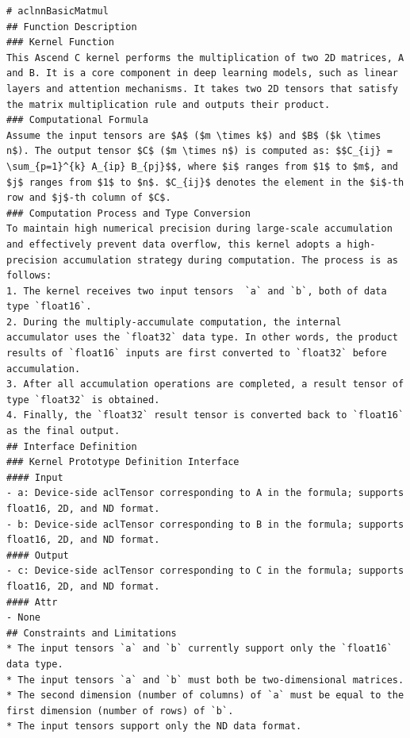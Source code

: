 \begin{table}[H]
\begin{tcolorbox}
\begin{tcolorbox}[
      sharp corners,
      colframe=taskblue,
      colback=taskblue!5,
      colbacktitle=taskblue!15,
      coltitle=taskblue,
      boxrule=0.4pt,
      title={\textbf{API\_Desc.md}},
      fonttitle=\bfseries\small,
      left=0pt,
      right=0pt,
      top=0pt,
      bottom=0pt
    ]
\begin{lstlisting}[style=mdstyle]
# aclnnBasicMatmul 
## Function Description 
### Kernel Function 
This Ascend C kernel performs the multiplication of two 2D matrices, A and B. It is a core component in deep learning models, such as linear layers and attention mechanisms. It takes two 2D tensors that satisfy the matrix multiplication rule and outputs their product.
### Computational Formula 
Assume the input tensors are $A$ ($m \times k$) and $B$ ($k \times n$). The output tensor $C$ ($m \times n$) is computed as: $$C_{ij} = \sum_{p=1}^{k} A_{ip} B_{pj}$$, where $i$ ranges from $1$ to $m$, and $j$ ranges from $1$ to $n$. $C_{ij}$ denotes the element in the $i$-th row and $j$-th column of $C$.
### Computation Process and Type Conversion
To maintain high numerical precision during large-scale accumulation and effectively prevent data overflow, this kernel adopts a high-precision accumulation strategy during computation. The process is as follows: 
1. The kernel receives two input tensors  `a` and `b`, both of data type `float16`.
2. During the multiply-accumulate computation, the internal accumulator uses the `float32` data type. In other words, the product results of `float16` inputs are first converted to `float32` before accumulation.
3. After all accumulation operations are completed, a result tensor of type `float32` is obtained.
4. Finally, the `float32` result tensor is converted back to `float16` as the final output.
## Interface Definition
### Kernel Prototype Definition Interface
#### Input 
- a: Device-side aclTensor corresponding to A in the formula; supports float16, 2D, and ND format.
- b: Device-side aclTensor corresponding to B in the formula; supports float16, 2D, and ND format.
#### Output 
- c: Device-side aclTensor corresponding to C in the formula; supports float16, 2D, and ND format.
#### Attr 
- None
## Constraints and Limitations
* The input tensors `a` and `b` currently support only the `float16` data type.
* The input tensors `a` and `b` must both be two-dimensional matrices.
* The second dimension (number of columns) of `a` must be equal to the first dimension (number of rows) of `b`.
* The input tensors support only the ND data format.
\end{lstlisting}
 \end{tcolorbox}
 

\end{tcolorbox}
\end{table}
